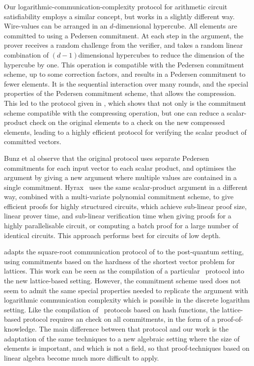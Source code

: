 Our logarithmic-communication-complexity protocol for arithmetic circuit satisfiability employs a similar concept, but works in a slightly different way. Wire-values can be arranged in an $d$-dimensional hypercube. All elements are committed to using a Pedersen commitment. At each step in the argument, the prover receives a random challenge from the verifier, and takes a random linear combination of $(d-1)$dimensional hypercubes to reduce the dimension of the hypercube by one. This operation is compatible with the Pedersen commitment scheme, up to some correction factors, and results in a Pedersen commitment to fewer elements. It is the sequential interaction over many rounds, and the special properties of the Pedersen commitment scheme, that allows the compression. This led to the protocol given in \cite{BootleCCGP16}, which shows that not only is the commitment scheme compatible with the compressing operation, but one can reduce a scalar-product check on the original elements to a check on the new compressed elements, leading to a highly efficient protocol for verifying the scalar product of committed vectors. 

Bunz et al \cite{BunzBBPWM18} observe that the original protocol uses separate Pedersen commitments for each input vector to each scalar product, and optimises the argument by giving a new argument where multiple values are contained in a single commitment. Hyrax~\cite{WahbyTSTW18} uses the same scalar-product argument in a different way, combined with a multi-variate polynomial commitment scheme, to give efficient proofs for highly structured circuits, which achieve sub-linear proof size, linear prover time, and sub-linear verification time when giving proofs for a highly parallelisable circuit, or computing a batch proof for a large number of identical circuits. This approach performs best for circuits of low depth.

\cite{BaumBCPGL18} adapts the square-root communication protocol of \cite{BootleCCGP16} to the post-quantum setting, using commitments based on the hardness of the shortest vector problem for lattices. This work can be seen as the compilation of a particular \ILC\ protocol into the new lattice-based setting. However, the commitment scheme used does not seem to admit the same special properties needed to replicate the argument with logarithmic communication complexity which is possible in the discrete logarithm setting. Like the compilation of \ILC\ protocols based on hash functions, the lattice-based protocol requires an check on all commitments, in the form of a proof-of-knowledge. The main difference between that protocol and our work is the adaptation of the same techniques to a new algebraic setting where the size of elements is important, and which is not a field, so that proof-techniques based on linear algebra become much more difficult to apply.


